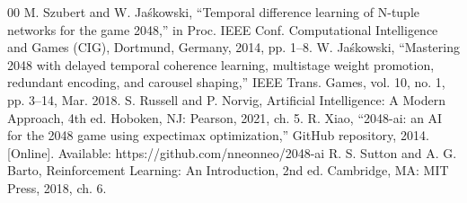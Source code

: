\documentclass[conference]{IEEEtran}
\begin{document}
\begin{thebibliography}{00}
 M. Szubert and W. Jaśkowski, ``Temporal difference learning of N-tuple networks for the game 2048,'' in Proc. IEEE Conf. Computational Intelligence and Games (CIG), Dortmund, Germany, 2014, pp. 1--8.
 W. Jaśkowski, ``Mastering 2048 with delayed temporal coherence learning, multistage weight promotion, redundant encoding, and carousel shaping,'' IEEE Trans. Games, vol. 10, no. 1, pp. 3--14, Mar. 2018.
 S. Russell and P. Norvig, Artificial Intelligence: A Modern Approach, 4th ed. Hoboken, NJ: Pearson, 2021, ch. 5.
 R. Xiao, ``2048-ai: an AI for the 2048 game using expectimax optimization,'' GitHub repository, 2014. [Online]. Available: https://github.com/nneonneo/2048-ai
 R. S. Sutton and A. G. Barto, Reinforcement Learning: An Introduction, 2nd ed. Cambridge, MA: MIT Press, 2018, ch. 6.
\end{thebibliography}
\vspace{12pt}
\end{document}
